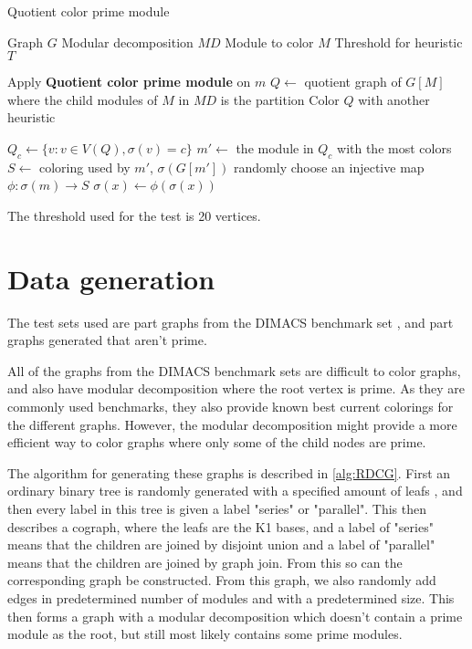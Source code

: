 \documentclass{amsart}
\begin{document}
\begin{algorithm}[H]
  \caption{Quotient color prime module}
  \begin{algorithmic}[1]
    \REQUIRE Graph $G$
    \REQUIRE Modular decomposition $MD$
    \REQUIRE Module to color $M$
    \REQUIRE Threshold for heuristic $T$

    \ENDIF
        \STATE Apply \textbf{Quotient color prime module} on $m$
    \ENDFOR
    \STATE $Q \leftarrow $ quotient graph of $G[M]$ where the child modules of $M$ in $MD$ is the partition
    \STATE Color $Q$ with another heuristic

        \STATE $Q_c \leftarrow \{ v : v \in V(Q), \sigma(v) = c\}$
        \STATE $m' \leftarrow$ the module in $Q_c$ with the most colors
        \STATE $S \leftarrow$ coloring used by $m'$, $\sigma(G[m'])$
            \STATE randomly choose an injective map $\phi:\sigma(m)\to S$
                \STATE $\sigma(x) \leftarrow \phi(\sigma(x))$
            \ENDFOR
        \ENDFOR
    \ENDFOR

  \end{algorithmic}
\end{algorithm}

The threshold used for the test is 20 vertices.

\section{Data generation}
\label{sec:Data}

The test sets used are part graphs from the DIMACS benchmark set \cite{DIMACS}, 
and part graphs generated that aren't prime.

All of the graphs from the DIMACS benchmark sets are difficult to color graphs,
and also have modular decomposition where the root vertex is prime. As they are
commonly used benchmarks, they also provide known best current colorings for the
different graphs. However, the modular decomposition might provide a more
efficient way to color graphs where only some of the child nodes are prime. 

The algorithm for generating these graphs is described in \autoref{alg:RDCG}.
First an ordinary binary tree is randomly generated with a specified amount of
leafs , and then every label in this tree is given a label "series" or
"parallel".  This then describes a cograph, where the leafs are the K1 bases,
and a label of "series" means that the children are joined by disjoint union and
a label of "parallel" means that the children are joined by graph join.  From
this so can the corresponding graph be constructed. From this graph, we also
randomly add edges in predetermined number of modules and with a predetermined
size. This then forms a graph with a modular decomposition which doesn't contain
a prime module as the root, but still most likely contains some prime modules.
\end{document}
